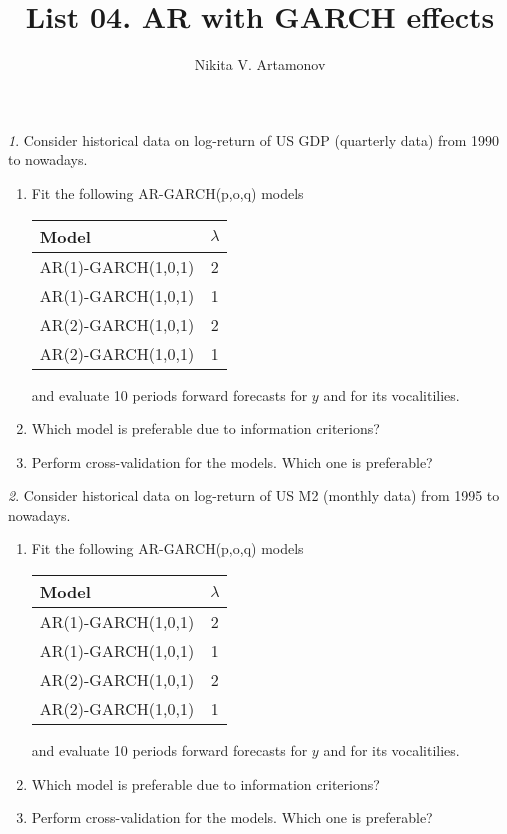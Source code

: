 \documentclass[12pt]{article}
\title{List 04. AR with GARCH effects}
\author{Nikita V. Artamonov}
\theoremstyle{remark}
\newtheorem{exercise}{}[section]
\begin{document}
\maketitle



\begin{exercise}
Consider historical data on log-return of US GDP (quarterly data) from 1990 to nowadays.
\begin{enumerate}
\item Fit the following AR-GARCH(p,o,q) models
\begin{center}
\begin{tabular}{l|c}
		Model & \(\lambda\) \\ \hline
		AR(1)-GARCH(1,0,1) & 2 \\
		AR(1)-GARCH(1,0,1) & 1 \\
		AR(2)-GARCH(1,0,1) & 2 \\
		AR(2)-GARCH(1,0,1) & 1 \\ \hline
	\end{tabular}
	\end{center} 
	and evaluate 10 periods forward forecasts for \(y\) and for its vocalitilies.
	\item Which model is preferable due to information criterions?
	\item Perform cross-validation for the models. Which one is preferable?
\end{enumerate}
\end{exercise}
	
\begin{exercise}
Consider historical data on log-return of US M2 (monthly data) from 1995 to nowadays.
\begin{enumerate}
	\item Fit the following AR-GARCH(p,o,q) models
	\begin{center}
	\begin{tabular}{l|c}
		Model & \(\lambda\) \\ \hline
		AR(1)-GARCH(1,0,1) & 2 \\
		AR(1)-GARCH(1,0,1) & 1 \\
		AR(2)-GARCH(1,0,1) & 2 \\
		AR(2)-GARCH(1,0,1) & 1 \\ \hline
	\end{tabular}
	\end{center} 
	and evaluate 10 periods forward forecasts for \(y\) and for its vocalitilies.
	\item Which model is preferable due to information criterions?
	\item Perform cross-validation for the models. Which one is preferable?
\end{enumerate}
\end{exercise}
\end{document}
